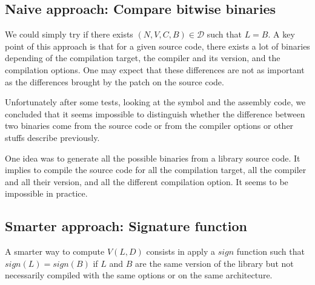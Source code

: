 \documentclass{article}
\newcommand{\signature}{{sign}}
\begin{document}
	        

    

    \subsection{Naive approach: Compare bitwise binaries }
    \label{naive-notations}
    We could simply try if there exists $(N, V, C, B) \in  \mathcal{D}$ such that $L = B$. A key point of this approach is that for a given source code, there exists a lot of binaries depending of the compilation target, the compiler and its version, and the compilation options. One may expect that these differences are not as important as the differences brought by the patch on the source code.

    Unfortunately after some tests, looking at the symbol and the assembly code, we concluded that it seems impossible to distinguish whether the difference between two binaries come from the source code or from the compiler options or other stuffs describe previously.
    
    One idea was to generate all the possible binaries from a library source code. It implies to compile the source code for all the compilation target, all the compiler and all their version, and all the different compilation option. It seems to be impossible in practice.


    \subsection{Smarter approach: Signature function}\label{approach-sign}
    A smarter way to compute $V(L,D)$ consists in apply a $\signature$ function such that $\signature(L) = \signature(B)$ if $L$ and $B$ are the same version of the library but not necessarily compiled with the same options or on the same architecture.
	
\end{document}

